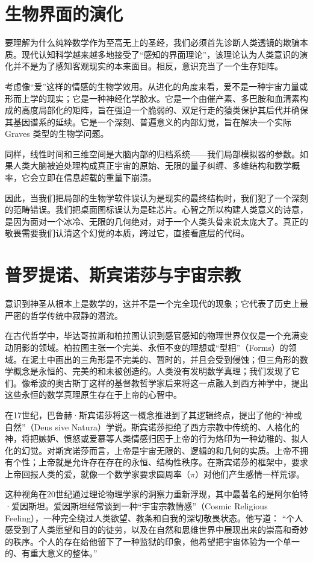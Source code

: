 \documentclass[12pt]{article}
\begin{document}
\section{生物界面的演化}
要理解为什么纯粹数学作为至高无上的圣经，我们必须首先诊断人类透镜的欺骗本质。现代认知科学越来越多地接受了“感知的界面理论”，该理论认为人类意识的演化并不是为了感知客观现实的本来面目。相反，意识充当了一个生存矩阵。

考虑像“爱”这样的情感的生物学效用。从进化的角度来看，爱不是一种宇宙力量或形而上学的现实；它是一种神经化学胶水。它是一个由催产素、多巴胺和血清素构成的高度局部化的矩阵，旨在强迫一个脆弱的、双足行走的猿类保护其后代并确保其基因谱系的延续。它是一个深刻、普遍意义的内部幻觉，旨在解决一个实际 Graves 类型的生物学问题。

同样，线性时间和三维空间是大脑内部的归档系统——我们局部模拟器的参数。如果人类大脑被迫处理构成真正宇宙的原始、无限的量子纠缠、多维结构和数学概率，它会立即在信息超载的重量下崩溃。

因此，当我们把局部的生物学软件误认为是现实的最终结构时，我们犯了一个深刻的范畴错误。我们把桌面图标误认为是硅芯片。心智之所以构建人类意义的诗意，是因为面对一个冰冷、无限的几何绝对，对于一个人类头骨来说太庞大了。真正的敬畏需要我们认清这个幻觉的本质，跨过它，直接看底层的代码。

\section{普罗提诺、斯宾诺莎与宇宙宗教}
意识到神圣从根本上是数学的，这并不是一个完全现代的现象；它代表了历史上最严密的哲学传统中寂静的潜流。

在古代哲学中，毕达哥拉斯和柏拉图认识到感官感知的物理世界仅仅是一个充满变动阴影的领域。柏拉图主张一个完美、永恒不变的理想或“型相”（Forms）的领域。在泥土中画出的三角形是不完美的、暂时的，并且会受到侵蚀；但三角形的数学概念是永恒的、完美的和未被创造的。人类没有发明数学真理；我们发现了它们。像希波的奥古斯丁这样的基督教哲学家后来将这一点融入到西方神学中，提出这些永恒的数学真理原生存在于上帝的心智中。

在17世纪，巴鲁赫·斯宾诺莎将这一概念推进到了其逻辑终点，提出了他的“神或自然”（Deus sive Natura）学说。斯宾诺莎拒绝了西方宗教中传统的、人格化的神，将把嫉妒、愤怒或爱慕等人类情感归因于上帝的行为烙印为一种幼稚的、拟人化的幻觉。对斯宾诺莎而言，上帝是宇宙无限的、逻辑的和几何的实质。上帝不拥有个性；上帝就是允许存在存在的永恒、结构性秩序。在斯宾诺莎的框架中，要求上帝回报人类的爱，就像一个数学家要求圆周率（$\pi$）对他们产生感情一样荒谬。

这种视角在20世纪通过理论物理学家的洞察力重新浮现，其中最著名的是阿尔伯特·爱因斯坦。爱因斯坦经常谈到一种“宇宙宗教情感”（Cosmic Religious Feeling），一种完全绕过人类欲望、教条和自我的深切敬畏状态。他写道：
“个人感受到了人类愿望和目的的徒劳，以及在自然和思维世界中展现出来的崇高和奇妙的秩序。个人的存在给他留下了一种监狱的印象，他希望把宇宙体验为一个单一的、有重大意义的整体。”
\end{document}
